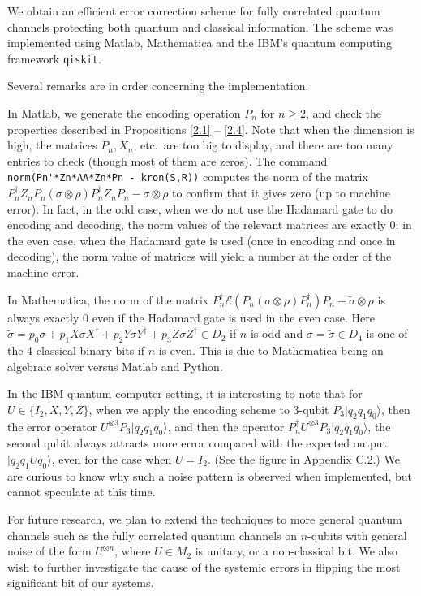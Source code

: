 \documentclass[11pt]{article}
\def\cE{{\mathcal E}}
\def\ra{{\rangle}}
\begin{document}
We obtain an efficient error correction  
scheme for fully correlated quantum channels
protecting both quantum and classical information.
The scheme was implemented using Matlab, Mathematica and
the IBM's quantum computing framework \verb|qiskit|.

\medskip
Several remarks are in order concerning the implementation.

In Matlab, we generate the encoding operation $P_n$ for $n \ge 2$, and check 
the properties described in Propositions \ref{2.1} -- \ref{2.4}.
Note that when the dimension is high, the matrices $P_n, X_n$, etc.\ are too big to display,
and there are too many entries to check (though most of them are zeros).
The command \verb|norm(Pn'*Zn*AA*Zn*Pn - kron(S,R))| computes the norm
of the matrix $P_n^\dag Z_n P_n(\sigma \otimes \rho)P_n^\dag Z_n P_n - \sigma \otimes \rho$
to confirm that it gives zero (up to machine error). In fact, in the odd case, when 
we do not use the Hadamard gate to do encoding and decoding, the norm values of
the relevant matrices are exactly 0; in the even case, when the Hadamard gate 
is used (once in encoding and once in decoding), the norm value of matrices 
will yield a number at the order of the machine error. 


In Mathematica, the norm of the matrix 
$P_n^\dag \cE( P_n (\sigma \otimes \rho) P_n^\dag) P_n  
-\tilde \sigma \otimes \rho$ is always exactly 0 even if the Hadamard
gate is used in the even case.
Here $\tilde \sigma  = p_0 \sigma + p_1 X\sigma X^\dag + p_2 Y \sigma Y^\dag 
+ p_3 Z \sigma Z^\dag \in D_2$ if $n$ is odd and 
$\sigma = \tilde \sigma \in D_4$ is one of the 4 classical binary bits if 
$n$ is even. This is due to Mathematica being an algebraic solver versus Matlab and Python.

In the IBM quantum computer setting, it is interesting to note that 
for $U \in \{I_2, X, Y, Z\}$, when we apply the encoding scheme to 3-qubit
$P_3 |q_2q_1q_0\ra$, then the error operator 
$U^{\otimes 3}P_3 |q_2 q_1 q_0\ra$, and then the operator
$P_n^\dag U^{\otimes 3}P_3 |q_2 q_1 q_0\ra$, the second
qubit always attracts more error compared with the expected output $|q_2 q_1 Uq_0\ra$,
even for the case when $U = I_2$. (See the figure in Appendix C.2.)
We are curious to know why such a noise
pattern is observed when implemented, but cannot speculate at this time.

 

\medskip
For future research, we plan to extend the techniques to more general quantum channels 
such as the fully correlated quantum channels on $n$-qubits
with general noise of the form $U^{\otimes n}$, where $U \in M_2$
is unitary, or a non-classical bit. We also wish to further investigate the cause of the systemic errors in flipping the most significant bit of our systems.
\end{document}
